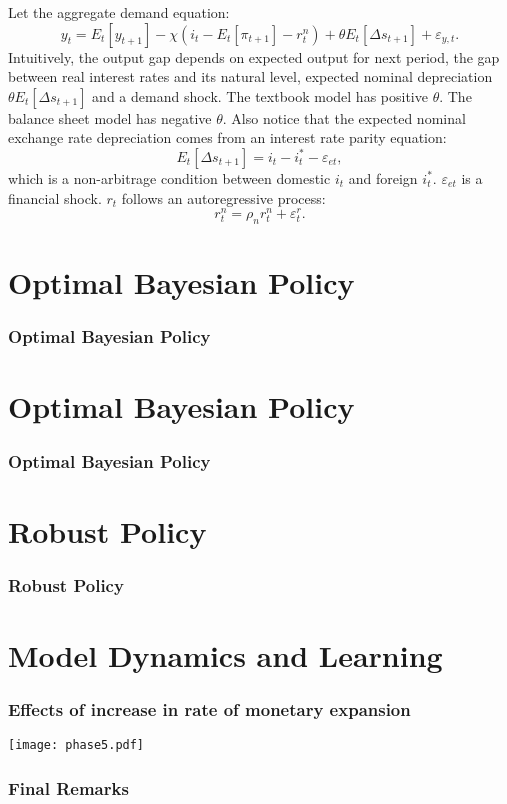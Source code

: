 \documentclass{beamer}
\begin{document}
\begin{frame} 
Let the aggregate demand equation:
\begin{equation}
y_t = E_t[y_{t+1}] - \chi(i_t - E_t[\pi_{t+1}] - r_t^n) + \theta
E_t[\Delta s_{t+1}] + \varepsilon_{y,t}.
\end{equation}
Intuitively, the output gap depends on expected output for next period, the
gap between real interest rates and its natural level, expected
nominal depreciation $\theta
E_t[\Delta s_{t+1}] $ and a demand shock. 
\newline
\newline
The textbook model has positive $\theta$.
The balance sheet model has negative $\theta$.
Also notice that the expected nominal exchange rate depreciation comes from an interest rate parity equation:
\begin{equation}
E_t[\Delta s_{t+1}] = i_t - i_t^* - \varepsilon_{et},
\end{equation}
which is a non-arbitrage condition between domestic $i_t$ and foreign $i_t^*$. $\varepsilon_{et}$
is a financial shock. 
\newline
\newline
$r_t$ follows an autoregressive process:
\begin{equation}
r_t^n = \rho_n r_t^n + \varepsilon_t^r.
\end{equation}
\end{frame}

\section{Optimal Bayesian Policy}
\begin{frame} 
\frametitle{Optimal Bayesian Policy} 
\end{frame}


\section{Optimal Bayesian Policy}
\begin{frame} 
\frametitle{Optimal Bayesian Policy} 
\end{frame}


\section{Robust Policy}
\begin{frame} 
\frametitle{Robust Policy} 
\end{frame}


\section{Model Dynamics and Learning}
\begin{frame} 
\frametitle{Effects of increase in rate of monetary expansion} 
\texttt{[image: phase5.pdf]}
\end{frame}

\begin{frame} 
\frametitle{Final Remarks} 

\end{frame} 
\end{document}

